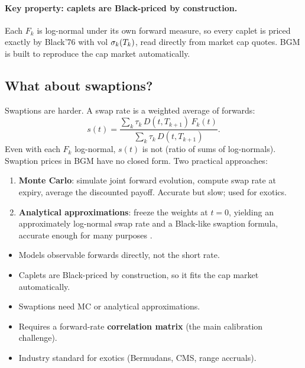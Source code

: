 \paragraph{Key property: caplets are Black-priced by construction.}
Each $F_k$ is log-normal under its own forward measure, so every
caplet is priced exactly by Black'76 with vol $\sigma_k(T_k)$, read
directly from market cap quotes.  BGM is built to reproduce the cap
market automatically.

\subsection{What about swaptions?}

Swaptions are harder.  A swap rate is a weighted average of forwards:
\begin{equation}
  s(t) = \frac{\sum_{k} \tau_k\, D(t, T_{k+1})\, F_k(t)}
              {\sum_{k} \tau_k\, D(t, T_{k+1})}.
\end{equation}
Even with each $F_k$ log-normal, $s(t)$ is not (ratio of sums of
log-normals).  Swaption prices in BGM have no closed form.  Two
practical approaches:
\begin{enumerate}
  \item \textbf{Monte Carlo}: simulate joint forward evolution,
    compute swap rate at expiry, average the discounted payoff.
    Accurate but slow; used for exotics.
  \item \textbf{Analytical approximations}: freeze the weights at
    $t=0$, yielding an approximately log-normal swap rate and a
    Black-like swaption formula, accurate enough for many purposes
    \citeHull.
\end{enumerate}

\begin{keyfactbox}
\begin{itemize}
  \item Models observable forwards directly, not the short rate.
  \item Caplets are Black-priced by construction, so it fits the cap
    market automatically.
  \item Swaptions need MC or analytical approximations.
  \item Requires a forward-rate \textbf{correlation matrix} (the main
    calibration challenge).
  \item Industry standard for exotics (Bermudans, CMS, range accruals).
\end{itemize}
\end{keyfactbox}

